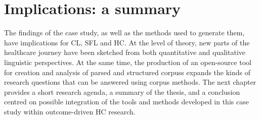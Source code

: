 

\section{Implications: a summary}

The findings of the case study, as well as the methods used to generate them, have implications for \gls{CL}, \gls{SFL} and \gls{HC}. At the level of theory, new parts of the healthcare journey have been sketched from both quantitative and qualitative linguistic perspectives. At the same time, the production of an open\hyp{}source tool for creation and analysis of parsed and structured \glspl{corpus} expands the kinds of research questions that can be answered using corpus methods. The next chapter provides a short research agenda, a summary of the thesis, and a conclusion centred on possible integration of the tools and methods developed in this case study within outcome\hyp{}driven \gls{HC} research.


